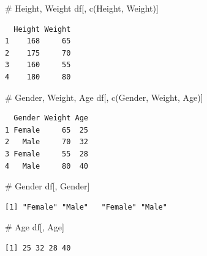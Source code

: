 \documentclass[
  letterpaper,
  DIV=11,
  numbers=noendperiod]{scrreprt}
\newenvironment{Shaded}{\begin{snugshade}}{\end{snugshade}}
\newcommand{\CommentTok}[1]{\textcolor[rgb]{0.37,0.37,0.37}{#1}}
\newcommand{\FunctionTok}[1]{\textcolor[rgb]{0.28,0.35,0.67}{#1}}
\newcommand{\NormalTok}[1]{\textcolor[rgb]{0.00,0.23,0.31}{#1}}
\newcommand{\StringTok}[1]{\textcolor[rgb]{0.13,0.47,0.30}{#1}}
\begin{document}
\begin{tcolorbox}[enhanced jigsaw, colbacktitle=quarto-callout-tip-color!10!white, opacitybacktitle=0.6, breakable, left=2mm, leftrule=.75mm, toprule=.15mm, toptitle=1mm, bottomtitle=1mm, colframe=quarto-callout-tip-color-frame, opacityback=0, coltitle=black, arc=.35mm, titlerule=0mm, colback=white, bottomrule=.15mm, title=\textcolor{quarto-callout-tip-color}{\faLightbulb}\hspace{0.5em}{Answer}, rightrule=.15mm]

\begin{Shaded}
\begin{Highlighting}[]
\CommentTok{\# Height, Weight}
\NormalTok{df[, }\FunctionTok{c}\NormalTok{(}\StringTok{\textquotesingle{}Height\textquotesingle{}}\NormalTok{, }\StringTok{\textquotesingle{}Weight\textquotesingle{}}\NormalTok{)]}
\end{Highlighting}
\end{Shaded}

\begin{verbatim}
  Height Weight
1    168     65
2    175     70
3    160     55
4    180     80
\end{verbatim}

\begin{Shaded}
\begin{Highlighting}[]
\CommentTok{\# Gender, Weight, Age}
\NormalTok{df[, }\FunctionTok{c}\NormalTok{(}\StringTok{\textquotesingle{}Gender\textquotesingle{}}\NormalTok{, }\StringTok{\textquotesingle{}Weight\textquotesingle{}}\NormalTok{, }\StringTok{\textquotesingle{}Age\textquotesingle{}}\NormalTok{)]}
\end{Highlighting}
\end{Shaded}

\begin{verbatim}
  Gender Weight Age
1 Female     65  25
2   Male     70  32
3 Female     55  28
4   Male     80  40
\end{verbatim}

\begin{Shaded}
\begin{Highlighting}[]
\CommentTok{\# Gender}
\NormalTok{df[, }\StringTok{\textquotesingle{}Gender\textquotesingle{}}\NormalTok{]}
\end{Highlighting}
\end{Shaded}

\begin{verbatim}
[1] "Female" "Male"   "Female" "Male"  
\end{verbatim}

\begin{Shaded}
\begin{Highlighting}[]
\CommentTok{\# Age}
\NormalTok{df[, }\StringTok{\textquotesingle{}Age\textquotesingle{}}\NormalTok{]}
\end{Highlighting}
\end{Shaded}

\begin{verbatim}
[1] 25 32 28 40
\end{verbatim}

\end{tcolorbox}
\end{document}
